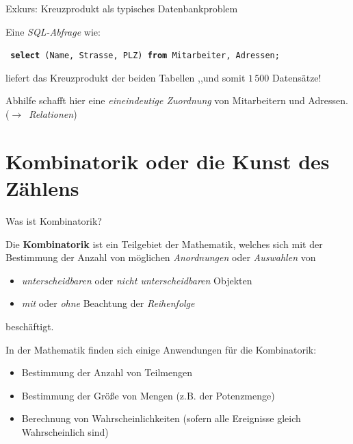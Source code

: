 \documentclass[12pt,ngerman,a4paper,ignorenonframetext,]{beamer}
\providecommand{\tightlist}{%
  \setlength{\itemsep}{0pt}\setlength{\parskip}{0pt}}
\begin{document}
\begin{frame}{Exkurs: Kreuzprodukt als typisches Datenbankproblem}
\begin{Beispiel}[]
\vspace*{1em}

Eine \emph{SQL-Abfrage} wie:

\vspace*{0.5em}

\texttt{ \textbf{select} (Name, Strasse, PLZ) \textbf{from} Mitarbeiter, Adressen;  }

\vspace*{0.5em}

liefert das Kreuzprodukt der beiden Tabellen ,,und somit \(1\,500\)
Datensätze!

Abhilfe schafft hier eine \emph{eineindeutige Zuordnung} von
Mitarbeitern und Adressen.\\
\mbox{($\to$ \textit{Relationen})}

\end{Beispiel}

\end{frame}

\hypertarget{kombinatorik-oder-die-kunst-des-zahlens}{%
\section{Kombinatorik oder die Kunst des
Zählens}\label{kombinatorik-oder-die-kunst-des-zahlens}}

\begin{frame}{Was ist Kombinatorik?}
\protect\hypertarget{was-ist-kombinatorik}{}

Die \textbf{Kombinatorik} ist ein Teilgebiet der Mathematik, welches
sich mit der Bestimmung der Anzahl von möglichen \emph{Anordnungen} oder
\emph{Auswahlen} von

\begin{itemize}
\tightlist
\item
  \emph{unterscheidbaren} oder \emph{nicht unterscheidbaren} Objekten
\item
  \emph{mit} oder \emph{ohne} Beachtung der \emph{Reihenfolge}
\end{itemize}

beschäftigt.

In der Mathematik finden sich einige Anwendungen für die Kombinatorik:

\begin{itemize}
\tightlist
\item
  Bestimmung der Anzahl von Teilmengen
\item
  Bestimmung der Größe von Mengen \mbox{(z.\thinspace{}B.}\xspace{} der
  Potenzmenge)
\item
  Berechnung von Wahrscheinlichkeiten (sofern alle Ereignisse gleich
  Wahrscheinlich sind)
\end{itemize}

\end{frame}
\end{document}
